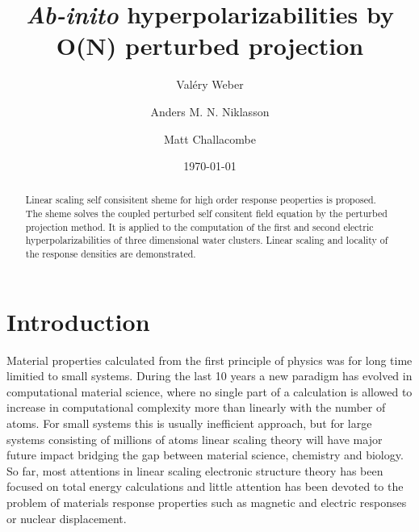 \documentclass[twocolumn,showpacs,preprintnumbers,amsmath,amssymb]{revtex4}
\begin{document}

\title{\emph{Ab-inito} hyperpolarizabilities by O(N) perturbed projection}%

\author{Val\'ery Weber}
\author{Anders M. N. Niklasson}%
\author{Matt Challacombe}%

%

\date{\today}%

\begin{abstract}
 Linear scaling self consisitent sheme for high order response peoperties
 is proposed. The sheme solves the coupled perturbed self consitent field 
 equation by the perturbed projection method. It is applied to the computation
 of the first and second electric hyperpolarizabilities of three
 dimensional water clusters. Linear scaling and locality of the response
 densities are demonstrated. 
\end{abstract}

\maketitle


\section{Introduction}
 Material properties calculated
 from the first principle of physics was for long time
 limitied to small systems. During the last 10 years a
 new paradigm has evolved in computational material science, where
 no single part of a calculation is allowed to increase in 
 computational complexity more than linearly with the number
 of atoms. For small systems this is usually inefficient
 approach, but for large systems consisting of millions
 of atoms linear scaling theory will have major future impact
 bridging the gap between material science, chemistry and biology.
 So far, most attentions in linear scaling electronic structure
 theory has been focused on total energy calculations and little
 attention has been devoted to the problem of materials response 
 properties such as magnetic and electric responses or nuclear
 displacement. 
\end{document}
